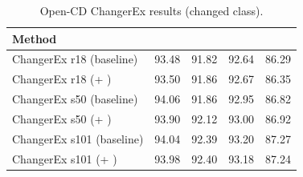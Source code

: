 \begin{table}[t]
  \centering
  \caption{Open-CD ChangerEx results (changed class).}
  \label{tab:changerex_focused}
  \setlength{\tabcolsep}{6pt}
  \renewcommand{\arraystretch}{1.1}
  \begin{tabular}{l r r r r}
    \toprule
    Method & \PrecC{} & \RecC{} & \Fonec{} & \Iouc{} \\
    \midrule
    ChangerEx r18 (baseline) & 93.48 & 91.82 & 92.64 & 86.29 \\
    ChangerEx r18 (+ \cosa{}) & 93.50 & 91.86 & 92.67 & 86.35 \\
    ChangerEx s50 (baseline) & 94.06 & 91.86 & 92.95 & 86.82 \\
    ChangerEx s50 (+ \cosa{}) & 93.90 & 92.12 & 93.00 & 86.92 \\
    ChangerEx s101 (baseline) & 94.04 & 92.39 & 93.20 & 87.27 \\
    ChangerEx s101 (+ \cosa{}) & 93.98 & 92.40 & 93.18 & 87.24 \\
    \bottomrule
  \end{tabular}
\end{table}

